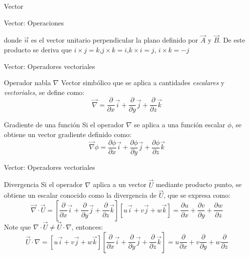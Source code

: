 \documentclass [xcolor=svgnames, t] {beamer}
\begin{document}
\begin{frame}{Vector}
\begin{block}{Vector: Operaciones}
\begin{enumerate}
\begin{textblock*}{3cm}
\end{textblock*}
donde $\vec{n}$ es el vector unitario perpendicular la plano definido por $\vec{A}$ y $\vec{B}$. De este producto se deriva que $i \times j=k$,$j \times k=i$,$k \times i = j$, $i \times k=-j$ 
\end{enumerate}
\end{block}
\end{frame}


\begin{frame}{Vector: Operadores vectoriales}
\begin{block}{Operador nabla $\nabla$}
Vector simb\'olico que se aplica a cantidades \emph{escalares} y \emph{vectoriales}, se define como:
\begin{equation}
\vec{\nabla} = \frac{\partial }{\partial x}\vec{i} + \frac{\partial }{\partial y}\vec{j} + \frac{\partial }{\partial z}\vec{k}
\label{nb}
\end{equation}
\end{block}
\begin{block}{Gradiente de una funci\'on}
Si el operador $\nabla$ se aplica a una funci\'on escalar $\phi$, se obtiene un vector gradiente definido como:
\begin{equation}
\vec{\nabla} \phi = \frac{\partial \phi}{\partial x}\vec{i} + \frac{\partial \phi}{\partial y}\vec{j} + \frac{\partial \phi}{\partial z}\vec{k}
\label{phi}
\end{equation}
\end{block}
\end{frame}

\begin{frame}{Vector: Operadores vectoriales}
\begin{block}{Divergencia}
Si el operador $\nabla$ aplica a un vector $\vec{U}$ mediante producto punto, se obtiene un escalar conocido como la divergencia de $\vec{U}$, que se expresa como:
\begin{equation}
\vec{\nabla} \cdot \vec{U} = \left[ \frac{\partial }{\partial x}\vec{i} + \frac{\partial }{\partial y}\vec{j} + \frac{\partial }{\partial z}\vec{k} \right] [u\vec{i}+v\vec{j}+w\vec{k}] = \frac{\partial u}{\partial x}+\frac{\partial v}{\partial y}+\frac{\partial w}{\partial z}
\label{di1}
\end{equation}
Note que $\nabla \cdot \vec{U} \ne \vec{U} \cdot \nabla$, entonces:
\begin{equation*}
\vec{U} \cdot \nabla  = [u\vec{i}+v\vec{j}+w\vec{k}] \left[ \frac{\partial }{\partial x}\vec{i} + \frac{\partial }{\partial y}\vec{j} + \frac{\partial }{\partial z}\vec{k} \right]  = u\frac{\partial}{\partial x}+v\frac{\partial}{\partial y}+w\frac{\partial}{\partial z}
\end{equation*}
\end{block}
\end{frame}
\end{document}

